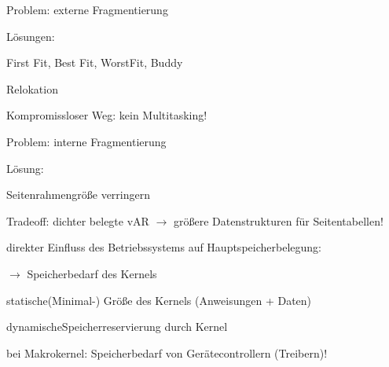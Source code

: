 \documentclass[a4paper]{article}
\begin{document}
\begin{multicols}{3}
    \begin{itemize*}
        \item
    \end{itemize*}

    Problem: externe Fragmentierung

    \begin{itemize*}
        \item
        \item
        Lösungen:
        \begin{itemize*}
            \item First Fit, Best Fit, WorstFit, Buddy
            \item Relokation
        \end{itemize*}
        \item
        Kompromissloser Weg: kein Multitasking!
    \end{itemize*}

    Problem: interne Fragmentierung

    \begin{itemize*}
        \item
        \item
        Lösung:
        \begin{itemize*}
            \item Seitenrahmengröße verringern
            \item Tradeoff: dichter belegte vAR $\rightarrow$ größere Datenstrukturen für Seitentabellen!
        \end{itemize*}
        \item
        direkter Einfluss des Betriebssystems auf Hauptspeicherbelegung:
        \begin{itemize*}
            \item $\rightarrow$ Speicherbedarf des Kernels
            \item statische(Minimal-) Größe des Kernels (Anweisungen + Daten)
            \item dynamischeSpeicherreservierung durch Kernel
            \item bei Makrokernel: Speicherbedarf von Gerätecontrollern (Treibern)!
        \end{itemize*}
    \end{itemize*}


\end{multicols}
\end{document}
